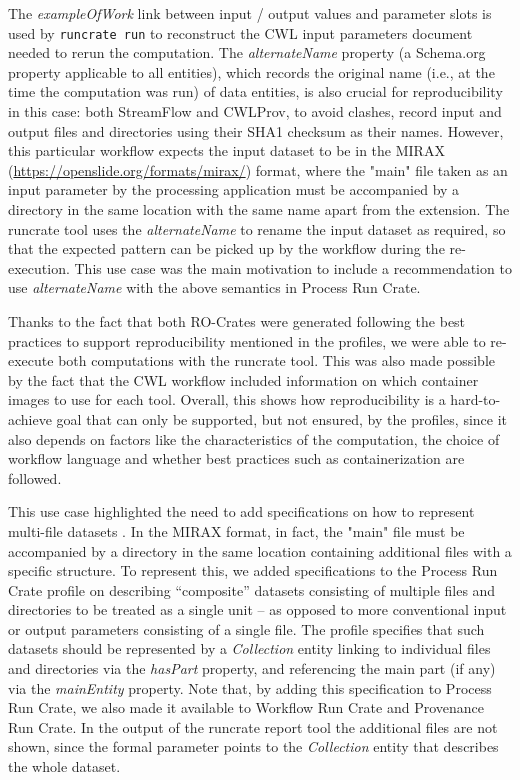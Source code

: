 \documentclass[10pt,letterpaper]{article}
\begin{document}
\begin{figure}
\begin{adjustwidth}{-0.5cm}{0in}
\end{adjustwidth}
\end{figure}



The \emph{exampleOfWork} link between input / output values and parameter slots is used by \texttt{runcrate run} to reconstruct the CWL input parameters document needed to rerun the computation.
The
\emph{alternateName} property (a Schema.org property applicable to all entities), which records the original name (i.e., at the time the computation was run) of data entities, is also crucial for reproducibility in this case: both StreamFlow and CWLProv, to avoid clashes, record input and output files and directories using their SHA1
checksum as their names. 
However, this particular workflow expects the input dataset to be in the MIRAX (\url{https://openslide.org/formats/mirax/}) format, where the "main" file taken as an input parameter by the processing application must be accompanied by a directory in the same location with the same name apart from the extension.
The runcrate tool uses the \emph{alternateName} to rename the input dataset as required, so that the expected pattern can be picked up by the workflow during the re-execution.
This use case was the main motivation to include a recommendation to use \emph{alternateName} with the above semantics in Process Run Crate.

Thanks to the fact that both RO-Crates were generated following the best practices to support reproducibility mentioned in the profiles, we were able to re-execute both computations with the runcrate tool.
This was also made possible by the fact that the CWL workflow included information on which container images to use for each tool.
Overall, this shows how reproducibility is a hard-to-achieve goal that can only be supported, but not ensured, by the profiles, since it also depends on factors like the characteristics of the computation, the choice of workflow language and whether best practices such as containerization are followed.

This use case highlighted the need to add specifications on how to represent multi-file datasets \cite[section Representing multi-file objects]{WRROC 2023a}. In the MIRAX format, in fact, the "main" file must be accompanied by a directory in the same location containing additional files with a specific structure.
To represent this, we added specifications to the Process Run Crate profile on describing “composite” datasets consisting of multiple files and directories to be treated as a single unit – as opposed to more conventional input or output parameters consisting of a single file. The profile specifies that such datasets should be represented by a \emph{Collection} entity linking to individual files and directories via the \emph{hasPart} property, and referencing the main part (if any) via the \emph{mainEntity} property. Note that, by adding this specification to Process Run Crate, we also made it available to Workflow Run Crate and Provenance Run Crate. In the output of the runcrate report tool the additional files are not shown, since the formal parameter points to the \emph{Collection} entity that describes the whole dataset.
\end{document}
